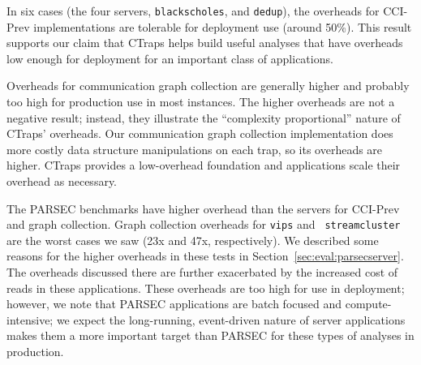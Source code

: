 \documentclass[preprint,9pt]{sigplanconf}
\newcommand{\addtodo}[1]{\textcolor{red}{[To do: #1]}}
\newcommand{\ctraps}{CTraps\xspace}
\newcommand{\ctrapsmm}{CTraps-NRR\xspace}
\begin{document}
In six cases (the four servers, {\tt blackscholes}, and {\tt dedup}), the overheads
for CCI-Prev implementations are tolerable for deployment use (around 50\%).
This result supports our claim that \ctraps helps build useful analyses that
have overheads low enough for deployment for an important class of
applications.  

Overheads for communication graph collection are generally higher and probably
too high for production use in most instances.  The higher overheads are not a
negative result; instead, they illustrate the ``complexity proportional''
nature of \ctraps' overheads.  Our communication graph collection
implementation does more costly data structure manipulations on each trap, so
its overheads are higher.  \ctraps provides a low-overhead foundation and
applications scale their overhead as necessary. 



The PARSEC benchmarks have higher overhead than the servers for CCI-Prev and
graph collection.  Graph collection overheads for {\tt vips} and {\tt
streamcluster} are the worst cases we saw (23x and 47x, respectively).  We
described some reasons for the higher overheads in these tests in
Section~\ref{sec:eval:parsecserver}.  The overheads discussed there are further
exacerbated by the increased cost of reads in these applications.  These
overheads are too high for use in deployment;  however, we note that PARSEC
applications are batch focused and compute-intensive; we expect the
long-running, event-driven nature of server applications makes them a more
important target than PARSEC for these types of analyses in production.  




\end{document}
